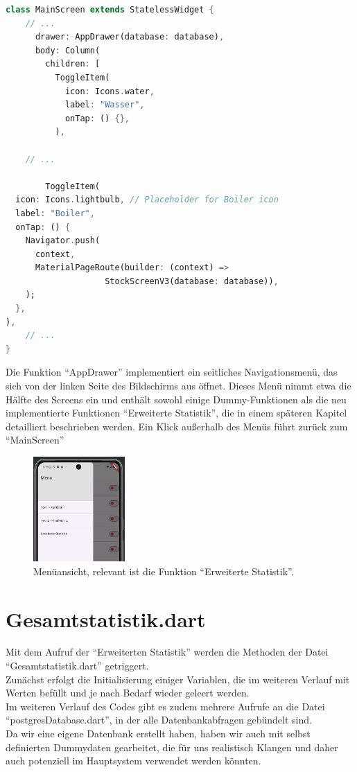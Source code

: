 \documentclass{article}
\begin{document}
    \begin{lstlisting}[language=Dart]
class MainScreen extends StatelessWidget {
    // ...
      drawer: AppDrawer(database: database),
      body: Column(
        children: [
          ToggleItem(
            icon: Icons.water,
            label: "Wasser",
            onTap: () {},
          ),

    // ...

        ToggleItem(
  icon: Icons.lightbulb, // Placeholder for Boiler icon
  label: "Boiler",
  onTap: () {
    Navigator.push(
      context,
      MaterialPageRoute(builder: (context) =>
                    StockScreenV3(database: database)),
    );
  },
),
    // ...
}
    \end{lstlisting}
    Die Funktion \enquote{AppDrawer} implementiert ein seitliches Navigationsmenü, das sich von der linken Seite des
    Bildschirms aus öffnet.
    Dieses Menü nimmt etwa die Hälfte des Screens ein und enthält sowohl einige Dummy-Funktionen
    als die neu implementierte Funktionen \enquote{Erweiterte Statistik}, die in einem späteren Kapitel detailliert
    beschrieben werden.
    Ein Klick außerhalb des Menüs führt zurück zum \enquote{MainScreen}

 \begin{figure}
    \centering
    \includegraphics[height=4cm]{images/MenueScreen}
    \caption{Menüansicht, relevant ist die Funktion \enquote{Erweiterte Statistik}.}
\end{figure}

    \section{Gesamtstatistik.dart}
    Mit dem Aufruf der \enquote{Erweiterten Statistik} werden die Methoden der Datei \enquote{Gesamtstatistik.dart}
    getriggert. \\
    Zunächst erfolgt die Initialisierung einiger Variablen, die im weiteren Verlauf mit Werten befüllt und je nach
    Bedarf wieder geleert werden. \\
    Im weiteren Verlauf des Codes gibt es zudem mehrere Aufrufe an die Datei \enquote{postgresDatabase.dart},
    in der alle Datenbankabfragen gebündelt sind. \\
    Da wir eine eigene Datenbank erstellt haben, haben wir auch mit selbst definierten Dummydaten gearbeitet,
    die für uns realistisch Klangen und daher auch potenziell im Hauptsystem verwendet werden könnten.
\end{document}

